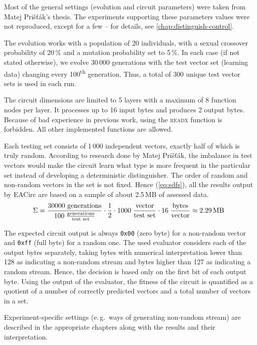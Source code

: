 \documentclass[12pt,oneside]{fithesis2}
\begin{document}
Most of the general settings (evolution and circuit parameters) were taken from Matej Prišťák's thesis. 
The experiments supporting these parameters values were not reproduced, except for a few -- for details,
see \autoref{chap:distinguish-control}.

The evolution works with a population of 20 individuals, with a sexual crossover probability of 20\,\% and a mutation probability
set to 5\,\%. In each case (if not stated otherwise), we evolve 30\,000 generations with the test vector set
(learning data) changing every 100\textsuperscript{th} generation. Thus, a total of 300 unique test vector sets is used in each run.

The circuit dimensions are limited to 5 layers with a maximum of 8 function nodes per layer. It processes up to 16 input bytes
and produces 2 output bytes. Because of bad experience in previous work, using the \textsc{readx} function is forbidden.
All other implemented functions are allowed.

Each testing set consists of 1\,000 independent vectors, exactly half of which is truly random. 
According to research done by Matej Prišťák, the imbalance in test vectors would make the circuit learn what type is more frequent
in the particular set instead of developing a deterministic distinguisher. 
The order of random and non-random vectors in the set is not fixed.
Hence (\autoref{eq:sdfs}), all the results output by EACirc are based on a sample of about 2.5\,MB of assessed data.
\begin{equation}
\label{eq:sdfs}
\Sigma = \frac{30000 \text{ generations}}{100 \; \frac{\text{generations}}{\text{test set}}}
         \cdot \frac{1}{2} \cdot 1000 \; \frac{\text{vector}}{\text{test set}}
         \cdot 16 \; \frac{\text{bytes}}{\text{vector}}
         \approx 2.29 \text{\,MB}
\end{equation}

The expected circuit output is always \texttt{0x00} (zero byte) for a non-random vector and \texttt{0xff} (full byte) 
for a random one.
The used evaluator considers each of the output bytes separately, taking bytes with numerical interpretation lower than
128 as indicating a non-random stream and bytes higher than 127 as indicating a random stream.
Hence, the decision is based only on the first bit of each output byte.
Using the output of the evaluator, the fitness of the circuit is quantified as a quotient of a number of 
correctly predicted vectors and a total number of vectors in a set.

Experiment-specific settings (e.\,g.\ ways of generating non-random stream) are described in the 
appropriate chapters along with the results and their interpretation.
\end{document}

